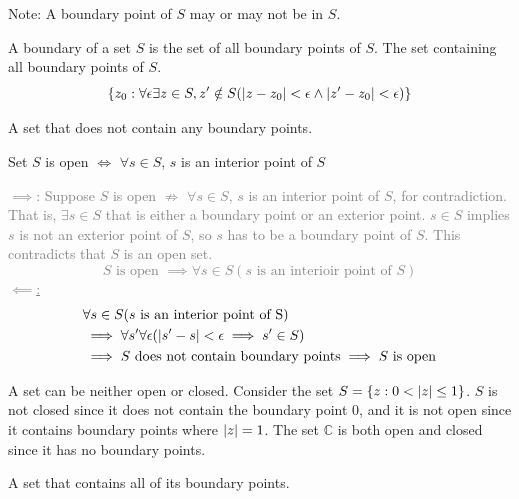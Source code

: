 \documentclass[12pt, english]{book}
\makeatletter
\renewenvironment{proof}[1][\proofname]{\par
	\pushQED{\qed}%
	\normalfont \topsep6\p@\@plus6\p@\relax
	\list{}{%
		\settowidth{\leftmargin}{\itshape\proofname:\hskip\labelsep}%
		\setlength{\labelwidth}{0pt}%
		\setlength{\itemindent}{-\leftmargin}%
	}%
	\item[\hskip\labelsep\itshape#1\@addpunct{:}]\ignorespaces
	}{ \popQED\endlist\@endpefalse}
\makeatother
\begin{document}
	Note: A boundary point of $S$ may or may not be in $S$.

	\begin{definition}
		\label{Boundary of a Set Definition - Complex}
		A boundary of a set $S$ is the set of all boundary points of $S$. The set containing all boundary points of $S$.
		$$\{z_0 : \forall \epsilon \exists z\in S, z'\notin S(\abs{z-z_0}<\epsilon \land \abs{z'-z_0}<\epsilon )\}$$ 
	\end{definition}

	\begin{definition}
		\label{Open Set Definition - Complex}
		A set that does not contain any boundary points. 
	\end{definition}

	\begin{theorem}
		Set $S$ is open $\iff$ $\forall s \in S$, $s$ is an interior point of $S$ 
	\end{theorem}
	\begin{proof}
		\textcolor{Grey}{
		\underline{$\implies$}:
		Suppose $S$ is open $\nRightarrow$ $\forall s \in S$, $s$ is an interior point of $S$, for contradiction. That is, $\exists s \in S$ that is either a boundary point or an exterior point. $s \in S$ implies $s$ is not an exterior point of $S$, so $s$ has to be a boundary point of $S$. This contradicts that $S$ is an open set. 
		$$S \text{ is open } \implies \forall s \in S (s \text{ is an interioir point of }S)$$
		\underline{$\impliedby$:}
		\begin{align*}
			&\forall s \in S (s \text{ is an interior point of S}) \\
			&\implies \forall s' \forall \epsilon (\abs{s'-s} < \epsilon \implies s' \in S)\\
			&\implies S \text{ does not contain boundary points} \implies S \text{ is open}
		\end{align*}
		}
	\end{proof}

	A set can be neither open or closed. Consider the set $S = \{z : 0 < \abs{z} \leq 1\}$. $S$ is not closed since it does not contain the boundary point $0$, and it is not open since it contains boundary points where $\abs{z} = 1$. The set $\mathbb{C}$ is both open and closed since it has no boundary points. 
	
	\begin{definition}
		\label{Closed Set Definition - Complex}
		A set that contains all of its boundary points. 
	\end{definition}
\end{document}
